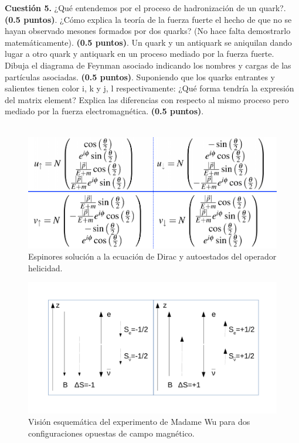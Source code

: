 \documentclass[paper=a4, fontsize=11pt]{scrartcl} %
\numberwithin{equation}{section} %
\numberwithin{figure}{section} %
\numberwithin{table}{section} %
\begin{document}
\textbf{Cuestión 5.} ¿Qué entendemos por el proceso de hadronización de un quark?. \textbf{(0.5 puntos)}. ¿Cómo explica la teoría de la fuerza fuerte el hecho de que
no se hayan observado mesones formados por dos quarks? (No hace falta demostrarlo matemáticamente). \textbf{(0.5 puntos)}. Un quark y un antiquark se aniquilan dando
lugar a otro quark y antiquark en un proceso mediado por la fuerza fuerte. Dibuja el diagrama de Feynman asociado indicando los nombres y cargas de las partículas
asociadas. \textbf{(0.5 puntos)}. Suponiendo que los quarks entrantes y salientes tienen color i, k y j, l respectivamente: ¿Qué forma tendría la expresión del 
matrix element? Explica las diferencias con respecto al mismo proceso pero mediado por la fuerza electromagnética. \textbf{(0.5 puntos)}. 
\\
\\


\begin{figure}[!h]
\begin{center}
\includegraphics[width=0.6\linewidth]{espinores.png}
\end{center}
\caption{Espinores solución a la ecuación de Dirac y autoestados del operador helicidad.}
\label{espinores}
\end{figure}

\begin{figure}[!h]
\begin{center}
\includegraphics[width=0.6\linewidth]{DibujoExamen.pdf}
\end{center}
\caption{Visión esquemática del experimento de Madame Wu para dos configuraciones opuestas de campo magnético.}
\label{dibujo}
\end{figure}
\end{document}
